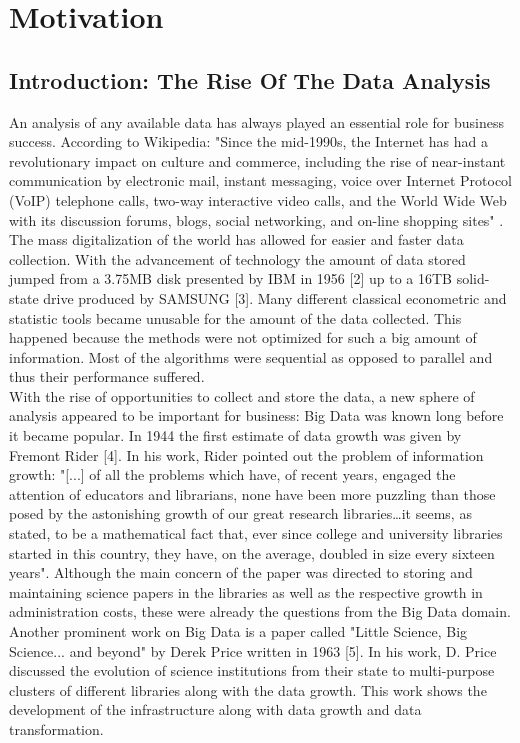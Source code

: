 \documentclass[
  twoside,
  11pt, a4paper,
  footinclude=true,
  headinclude=true,
  cleardoublepage=empty
]{scrreprt}
\begin{document}
    \chapter{Motivation}
        \section{Introduction: The Rise Of The Data Analysis}
        An analysis of any available data has always played an essential role for business success. According to Wikipedia: "Since the mid-1990s, the Internet has had a revolutionary impact on culture and commerce, including the rise of near-instant communication by electronic mail, instant messaging, voice over Internet Protocol (VoIP) telephone calls, two-way interactive video calls, and the World Wide Web with its discussion forums, blogs, social networking, and on-line shopping sites" \cite{}. The mass digitalization of the world has allowed for easier and faster data collection. With the advancement of technology the amount of data stored jumped from a 3.75MB disk presented by IBM in 1956 [2] up to a 16TB solid-state drive produced by SAMSUNG [3]. Many different classical econometric and statistic tools became unusable for the amount of the data collected. This happened because the methods were not optimized for such a big amount of information. Most of the algorithms were sequential as opposed to parallel and thus their performance suffered.\\
        With the rise of opportunities to collect and store the data, a new sphere of analysis appeared to be important for business: Big Data was known long before it became popular. In 1944 the first estimate of data growth was given by Fremont Rider [4]. In his work, Rider pointed out the problem of information growth: "[...] of all the problems which have, of recent years, engaged the attention of educators and librarians, none have been more puzzling than those posed by the astonishing growth of our great research libraries…it seems, as stated, to be a mathematical fact that, ever since college and university libraries started in this country, they have, on the average, doubled in size every sixteen years". Although the main concern of the paper was directed to storing and maintaining science papers in the libraries as well as the respective growth in administration costs, these were already the questions from the Big Data domain. Another prominent work on Big Data is a paper called "Little Science, Big Science... and beyond" by Derek Price written in 1963 [5]. In his work, D. Price discussed the evolution of science institutions from their state to multi-purpose clusters of different libraries along with the data growth. This work shows the development of the infrastructure along with data growth and data transformation.\\
\end{document}
